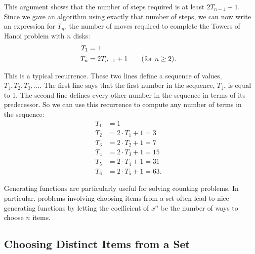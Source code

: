 This argument shows that the number of steps required is at least
$2T_{n-1} + 1$.  Since we gave an algorithm using exactly that number
of steps, we can now write an expression for $T_n$, the number of
moves required to complete the Towers of Hanoi problem with $n$ disks:
\begin{align*}
T_1 & = 1 \\
T_n & = 2T_{n-1} + 1 \text{\qquad (for $n \geq 2$)}.
\end{align*}

This is a typical recurrence.  These two lines define a sequence of
values, $T_1, T_2, T_3, \ldots$.  The first line says that the first
number in the sequence, $T_1$, is equal to 1.  The second line defines
every other number in the sequence in terms of its predecessor.  So we
can use this recurrence to compute any number of terms in the sequence:
\begin{align*}
T_1 & = 1 \\
T_2 & = 2 \cdot T_1 + 1 = 3 \\
T_3 & = 2 \cdot T_2 + 1 = 7 \\
T_4 & = 2 \cdot T_3 + 1 = 15 \\
T_5 & = 2 \cdot T_4 + 1 = 31 \\
T_6 & = 2 \cdot T_5 + 1 = 63.
\end{align*}
\fi

\begin{problems}
\classproblems
{}

\homeworkproblems
{}

\examproblems
{}

\end{problems}

\label{sec:gf_counting}

Generating functions are particularly useful for solving counting
problems.  In particular, problems involving choosing items from a set
often lead to nice generating functions by letting the coefficient of
$x^n$ be the number of ways to choose $n$ items.

\subsection{Choosing Distinct Items from a Set}

